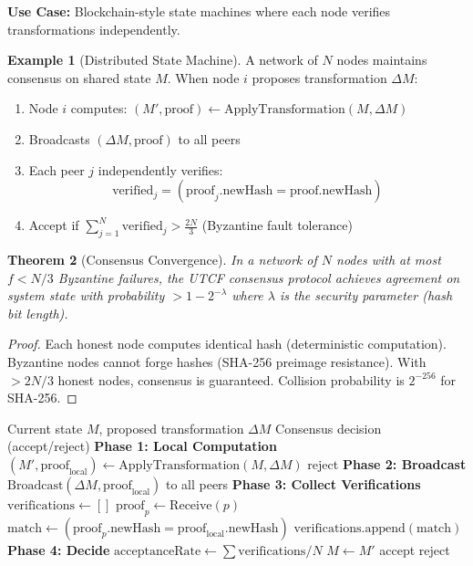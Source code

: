 \documentclass[11pt,a4paper]{article}
\newtheorem{theorem}{Theorem}[section]
\theoremstyle{definition}
\newtheorem{example}[theorem]{Example}
\theoremstyle{remark}
\begin{document}
\textbf{Use Case:} Blockchain-style state machines where each node verifies transformations independently.

\begin{example}[Distributed State Machine]
A network of $N$ nodes maintains consensus on shared state $M$. When node $i$ proposes transformation $\Delta M$:

\begin{enumerate}
\item Node $i$ computes: $(M', \text{proof}) \gets \text{ApplyTransformation}(M, \Delta M)$
\item Broadcasts $(\Delta M, \text{proof})$ to all peers
\item Each peer $j$ independently verifies:
\begin{equation}
\text{verified}_j = (\text{proof}_j.\text{newHash} = \text{proof}.\text{newHash})
\end{equation}
\item Accept if $\sum_{j=1}^{N} \text{verified}_j > \frac{2N}{3}$ (Byzantine fault tolerance)
\end{enumerate}
\end{example}

\begin{theorem}[Consensus Convergence]\label{thm:consensus}
In a network of $N$ nodes with at most $f < N/3$ Byzantine failures, the UTCF consensus protocol achieves agreement on system state with probability $> 1 - 2^{-\lambda}$ where $\lambda$ is the security parameter (hash bit length).
\end{theorem}

\begin{proof}
Each honest node computes identical hash (deterministic computation). Byzantine nodes cannot forge hashes (SHA-256 preimage resistance). With $>2N/3$ honest nodes, consensus is guaranteed. Collision probability is $2^{-256}$ for SHA-256.
\end{proof}

\begin{algorithm}
\caption{Distributed Consensus Protocol}\label{alg:consensus}
\begin{algorithmic}[1]
\Require Current state $M$, proposed transformation $\Delta M$
\Ensure Consensus decision (accept/reject)
\State \textbf{Phase 1: Local Computation}
\State $(M', \text{proof}_{\text{local}}) \gets \text{ApplyTransformation}(M, \Delta M)$
  \State \Return reject
\EndIf
\State \textbf{Phase 2: Broadcast}
\State $\text{Broadcast}(\Delta M, \text{proof}_{\text{local}})$ to all peers
\State \textbf{Phase 3: Collect Verifications}
\State $\text{verifications} \gets []$
  \State $\text{proof}_p \gets \text{Receive}(p)$
  \State $\text{match} \gets (\text{proof}_p.\text{newHash} = \text{proof}_{\text{local}}.\text{newHash})$
  \State $\text{verifications.append}(\text{match})$
\EndFor
\State \textbf{Phase 4: Decide}
\State $\text{acceptanceRate} \gets \sum \text{verifications} / N$
  \State $M \gets M'$ 
  \State \Return accept
\Else
  \State \Return reject
\EndIf
\end{algorithmic}
\end{algorithm}
\end{document}
